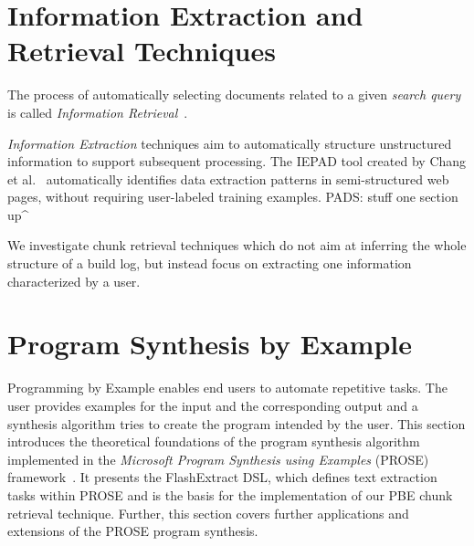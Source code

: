 \documentclass[\myrootdir/main.tex]{subfiles}
\begin{document}
\section{Information Extraction and Retrieval Techniques}

The process of automatically selecting documents related to a given \emph{search query} is called \emph{Information Retrieval}~\cite{schutze2008introduction}.

\emph{Information Extraction} techniques aim to automatically structure unstructured information to support subsequent processing.
The IEPAD tool created by Chang et al.~\cite{chang2003automatic} automatically identifies data extraction patterns in semi-structured web pages, without requiring user-labeled training examples.
PADS: stuff one section up^

We investigate chunk retrieval techniques which do not aim at inferring the whole structure of a build log, but instead focus on extracting one information characterized by a user.






\section{Program Synthesis by Example}
\label{sec:rw-prose}
Programming by Example enables end users to automate repetitive tasks.
The user provides examples for the input and the corresponding output and a synthesis algorithm tries to create the program intended by the user.
This section introduces the theoretical foundations of the program synthesis algorithm implemented in the \emph{Microsoft Program Synthesis using Examples} (PROSE) framework~\cite{prose2019webpage}.
It presents the FlashExtract DSL, which defines text extraction tasks within PROSE and is the basis for the implementation of our PBE chunk retrieval technique.
Further, this section covers further applications and extensions of the PROSE program synthesis.
\end{document}
